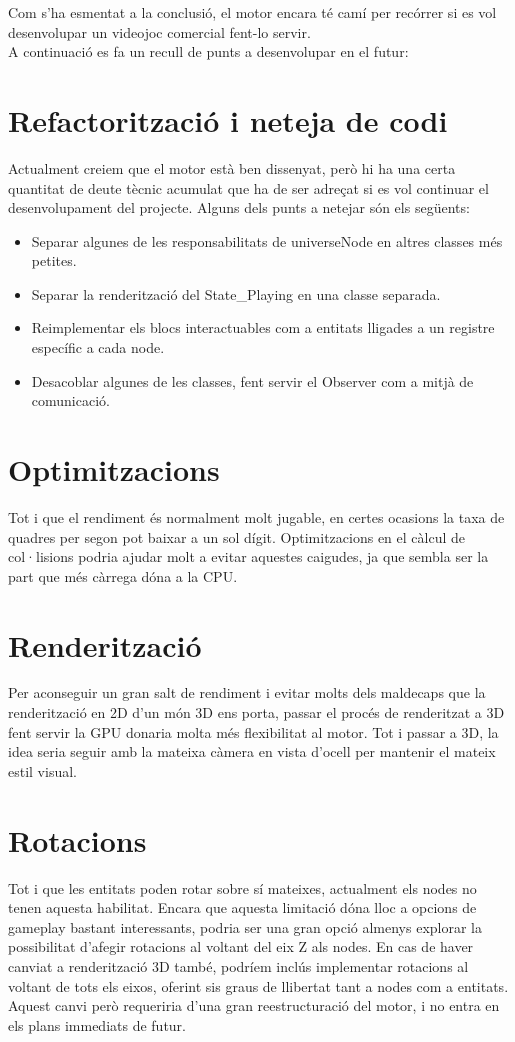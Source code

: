 Com s'ha esmentat a la conclusió, el motor encara té camí per recórrer si es vol desenvolupar un videojoc comercial fent-lo servir.
\\
A continuació es fa un recull de punts a desenvolupar en el futur:
\section{Refactorització i neteja de codi}
Actualment creiem que el motor està ben dissenyat, però hi ha una certa quantitat de deute tècnic acumulat que ha de ser adreçat si es vol continuar el desenvolupament del projecte.
Alguns dels punts a netejar són els següents:
\begin{itemize}
  \item Separar algunes de les responsabilitats de universeNode en altres classes més petites.
  \item Separar la renderització del State\_Playing en una classe separada.
  \item Reimplementar els blocs interactuables com a entitats lligades a un registre específic a cada node.
  \item Desacoblar algunes de les classes, fent servir el Observer com a mitjà de comunicació.
\end{itemize}

\section{Optimitzacions}
Tot i que el rendiment és normalment molt jugable, en certes ocasions la taxa de quadres per segon pot baixar a un sol dígit.
Optimitzacions en el càlcul de col·lisions podria ajudar molt a evitar aquestes caigudes, ja que sembla ser la part que més càrrega dóna a la CPU.
\section{Renderització}
Per aconseguir un gran salt de rendiment i evitar molts dels maldecaps que la renderització en 2D d'un món 3D ens porta, passar el procés de renderitzat a 3D fent servir la GPU donaria molta més flexibilitat al motor.
Tot i passar a 3D, la idea seria seguir amb la mateixa càmera en vista d'ocell per mantenir el mateix estil visual.
\section{Rotacions}
Tot i que les entitats poden rotar sobre sí mateixes, actualment els nodes no tenen aquesta habilitat. Encara que aquesta limitació dóna lloc a opcions de gameplay bastant interessants, podria ser una gran opció almenys explorar la possibilitat d'afegir rotacions al voltant del eix Z als nodes.
En cas de haver canviat a renderització 3D també, podríem inclús implementar rotacions al voltant de tots els eixos, oferint sis graus de llibertat tant a nodes com a entitats. Aquest canvi però requeriria d'una gran reestructuració del motor, i no entra en els plans immediats de futur.
